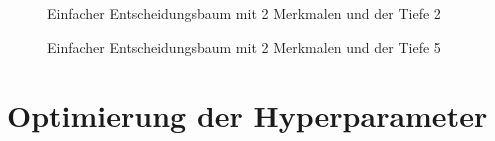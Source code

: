\documentclass[12pt, a4paper]{article}
\begin{document}
\begin{figure}
\centering
\def\svgwidth{350pt}

\caption{Einfacher Entscheidungsbaum mit 2 Merkmalen und der Tiefe 2}
\label{fig:decisiontree_example_2}
\end {figure}




\begin{figure}
\centering
\def\svgwidth{350pt}

\caption{Einfacher Entscheidungsbaum mit 2 Merkmalen und der Tiefe 5}
\label{fig:decisiontree_example}
\end {figure}



\newpage

\section{Optimierung der Hyperparameter}
\end{document}

